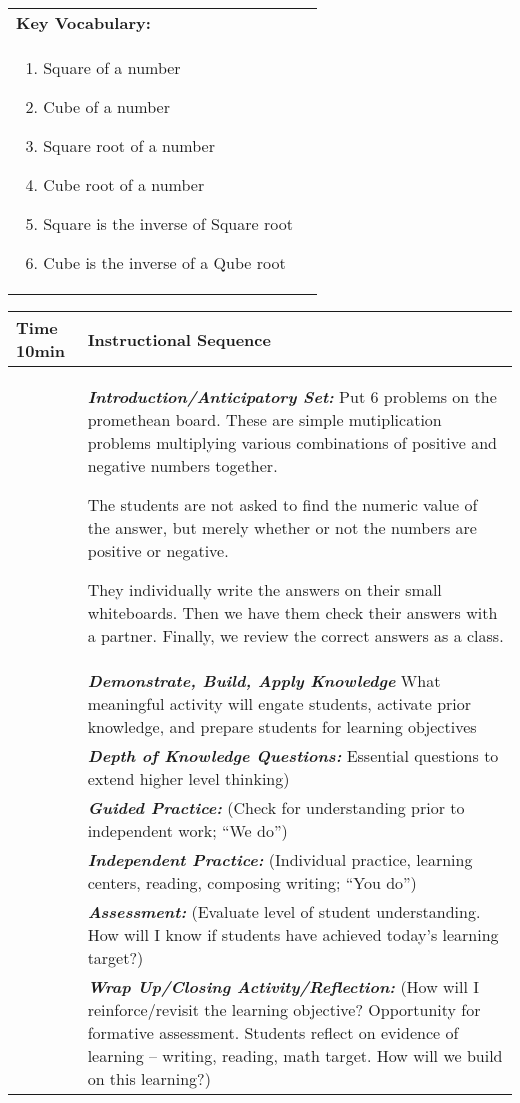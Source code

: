 \begin{tabularx}{\textwidth}{|X|X|}
               \textbf{Key Vocabulary:}  \\
                      {\begin{enumerate}
                        \item Square of a number
                        \item Cube of a number
                        \item Square root of a number
                        \item Cube root of a number
                        \item Square is the inverse of Square root
                        \item Cube is the inverse of a Qube root
                      \end{enumerate}} \\
                      \hline
\end{tabularx}

\pagebreak

\begin{tabularx}{\textwidth}{|p{0.5in}|X|}
  \hline
  \centerline{\textbf{\large Time} 10min} &  \textbf{\large Instructional Sequence } \\
  \hline
  \textbf{} &  \textbf{\em Introduction/Anticipatory Set:} Put 6 problems on the promethean board.  These are simple mutiplication problems multiplying various combinations of positive and negative numbers together.

  The students are not asked to find the numeric value of the answer, but merely whether or not the numbers are positive or negative.

  They individually write the answers on their small whiteboards.  Then we have them check their answers with a partner.  Finally, we review the correct answers as a class. \\
  \hline
  \textbf{} &  \textbf{\em Demonstrate, Build, Apply Knowledge} {\tiny What meaningful activity will engate students, activate prior knowledge, and prepare students for learning objectives} \\
  \hline
  \textbf{} &  \textbf{\em Depth of Knowledge Questions:} {\tiny Essential questions to extend higher level thinking)
} \\
  \hline
  \textbf{} &  \textbf{\em Guided Practice:} {\tiny (Check for understanding prior to independent work; “We do”)} \\
  \hline
  \textbf{} &  \textbf{\em Independent Practice:} {\tiny (Individual practice, learning centers, reading, composing writing; “You do”)} \\
  \hline
  \textbf{} &  \textbf{\em Assessment:} {\tiny (Evaluate level of student understanding. How will I know if students have achieved today’s learning target?)} \\
  \hline
  \textbf{} &  \textbf{\em Wrap Up/Closing Activity/Reflection:} {\tiny (How will I reinforce/revisit the learning objective? Opportunity for formative assessment. Students reflect on evidence of learning – writing, reading, math target. How will we build on this learning?)} \\
  \hline
\end{tabularx}

